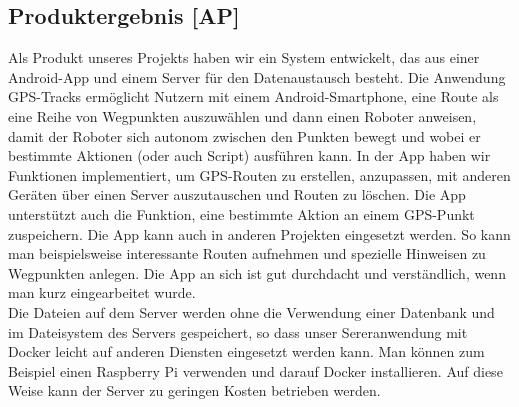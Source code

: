 \documentclass[10pt]{article}
\begin{document}
\subsection{Produktergebnis [AP]}
    Als Produkt unseres Projekts haben wir ein System entwickelt, das aus einer Android-App und einem Server für den Datenaustausch besteht.
    Die Anwendung GPS-Tracks ermöglicht Nutzern mit einem Android-Smartphone, eine Route als eine Reihe von Wegpunkten auszuwählen 
    und dann einen Roboter anweisen, damit der Roboter sich autonom zwischen den Punkten bewegt und wobei er bestimmte Aktionen (oder auch Script) ausführen kann. 
    In der App haben wir Funktionen implementiert, um GPS-Routen zu erstellen, anzupassen, mit anderen Geräten über einen Server auszutauschen
    und Routen zu löschen. Die App unterstützt auch die Funktion, eine bestimmte Aktion an einem GPS-Punkt zuspeichern. Die App kann auch in anderen 
    Projekten eingesetzt werden. So kann man beispielsweise interessante Routen aufnehmen und spezielle Hinweisen zu Wegpunkten anlegen.
    Die App an sich ist gut durchdacht und verständlich, wenn man kurz eingearbeitet wurde. \\ Die Dateien auf dem Server werden ohne die Verwendung einer Datenbank
    und im Dateisystem des Servers gespeichert, so dass unser Sereranwendung mit Docker leicht auf anderen Diensten eingesetzt werden kann. Man können zum Beispiel einen Raspberry Pi verwenden und darauf
    Docker installieren. Auf diese Weise kann der Server zu geringen Kosten betrieben werden. 
\end{document}
